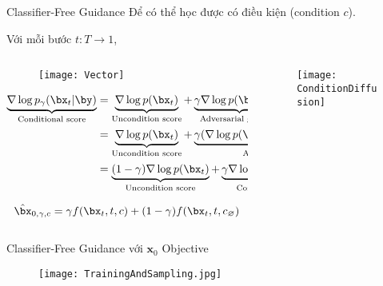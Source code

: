
\begin{frame}{Classifier-Free Guidance}
	\small
	Để có thể học được có điều kiện (condition $c$).
	
	Với mỗi bước $t: T \rightarrow 1$, 
	\begin{columns}
		\begin{column}{0.6\textwidth}
			\begin{figure}
				\centering
				\texttt{[image: Vector]}
			\end{figure}
			{\footnotesize
			\begin{align*}
				\underbrace{\nabla \log p_{\gamma}(\bx_t | \by)}_{\text{Conditional score}} 
				&= \underbrace{\nabla \log p(\bx_t)}_{\text{Uncondition score}} + 
				\underbrace{\gamma \nabla \log p(\by | \bx_t)}_{\text{Adversarial gradient}} \\
				&= \underbrace{\nabla \log p(\bx_t)}_{\text{Uncondition score}} + 
				\underbrace{\gamma (\nabla \log p(\bx_t | \by) - \nabla \log p( \bx_t) )}_{\text{Adversarial gradient}} \\
				&= \underbrace{(1 - \gamma)\nabla \log p(\bx_t)}_{\text{Uncondition score}} + 
				\underbrace{\gamma \nabla \log p(\bx_t | \by)}_{\text{Condition score}}
			\end{align*}}
		
		\vspace{-15pt}
		\begin{equation*}
			\hat{\bx}_{0, \gamma, c} = \gamma f(\bx_t, t, c) + (1-\gamma) f (\bx_t, t, c_\varnothing)
		\end{equation*}
	
			
			
			
%			
			
		\end{column}
		
		\begin{column}{0.4\textwidth}
			\begin{figure}
				\centering
				\texttt{[image: ConditionDiffusion]}
			\end{figure}
		\end{column}
	\end{columns}
	
\end{frame}


\begin{frame}{Classifier-Free Guidance với $\mathbf{x}_0$ Objective}
	\begin{figure}
		\centering
		\texttt{[image: TrainingAndSampling.jpg]}
	\end{figure}
\end{frame}


